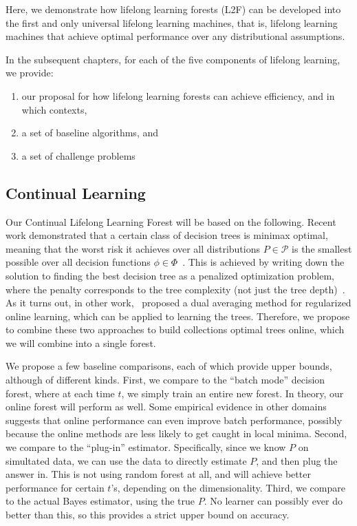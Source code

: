 \documentclass{article}
\begin{document}
Here, we demonstrate how lifelong learning forests (L2F) can be developed into the first and only universal lifelong learning machines, that is, lifelong learning machines that achieve optimal performance over any distributional assumptions.

In the subsequent chapters,  for each of the five components of lifelong learning, we provide:
\begin{enumerate}
    \item our proposal for how lifelong learning forests can achieve efficiency, and in which contexts,
    \item a set of baseline algorithms, and
    \item a set of challenge problems
\end{enumerate}

\subsection{Continual Learning}

Our Continual Lifelong Learning Forest will be based on the following.  Recent work demonstrated that a certain class of decision trees is minimax optimal, meaning that the worst risk it achieves over all distributions $P \in \mathcal{P}$ is the smallest possible over all decision functions $\phi \in \Phi$~\cite{Scott2006}.  This is achieved by writing down the solution to finding the best decision tree as a penalized optimization problem, where the penalty corresponds to the tree complexity (not just the tree depth)~\cite{Scott2005}. As it turns out, in other work,~\citet{Xiao2010} proposed a dual averaging method for regularized online learning, which can be applied to learning the trees. Therefore, we propose to combine these two approaches to build collections optimal trees online, which we will combine into a single forest. 

We propose a few baseline comparisons, each of which provide upper bounds, although of different kinds.  First, we compare to the ``batch mode'' decision forest, where at each time $t$, we simply train an entire new forest.  In theory, our online forest will perform as well.  Some empirical evidence in other domains suggests that online performance can even improve batch performance, possibly because the online methods are less likely to get caught in local minima.  Second, we compare to the ``plug-in'' estimator.  Specifically, since we know $P$ on simultated data, we can use the data to directly estimate $P$, and then plug the answer in.  This is not using random forest at all, and will achieve better performance for certain $t$'s, depending on the dimensionality.  Third, we compare to the actual Bayes estimator, using the true $P$.  No learner can possibly ever do better than this, so this provides a strict upper bound on accuracy. 
\end{document}
